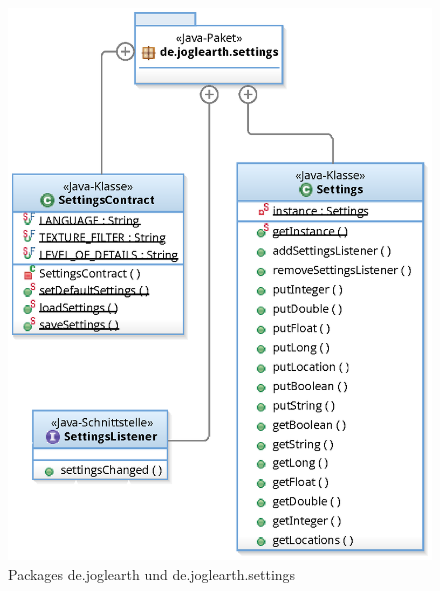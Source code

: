 \documentclass[10pt]{scrreprt}
\begin{document}
\begin{figure}[!htb]
\begin{minipage}[c]{6cm}
			\includegraphics[scale=0.55]{de_joglearth_settings.eps}
        \end{minipage}
        \caption{Packages de.joglearth und de.joglearth.settings}
\end{figure}

\vspace{2mm}
\end{document}
